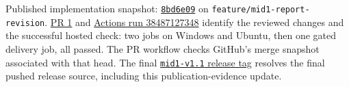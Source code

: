 Published implementation snapshot: \href{https://github.com/Ahmed-Javaid/Investify-FYP-2027/commit/8bd6e09827052213f8f0d1fbde1ae63c1fdbf86a}{\texttt{8bd6e09}} on \texttt{feature/mid1-report-revision}. \href{https://github.com/Ahmed-Javaid/Investify-FYP-2027/pull/1}{PR 1} and \href{https://github.com/Ahmed-Javaid/Investify-FYP-2027/actions/runs/38487127348}{Actions run 38487127348} identify the reviewed changes and the successful hosted check: two jobs on Windows and Ubuntu, then one gated delivery job, all passed. The PR workflow checks GitHub's merge snapshot associated with that head. The final \href{https://github.com/Ahmed-Javaid/Investify-FYP-2027/tree/mid1-v1.1}{\texttt{mid1-v1.1} release tag} resolves the final pushed release source, including this publication-evidence update.
